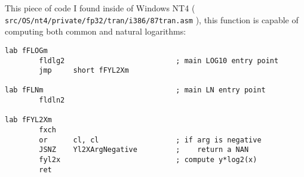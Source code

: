 This piece of code I found inside of Windows NT4 ( \texttt{src/OS/nt4/private/fp32/tran/i386/87tran.asm} ), 
this function is capable of computing both common and natural logarithms: 

\begin{lstlisting}[caption=Assembly language code]
lab fFLOGm
        fldlg2                          ; main LOG10 entry point
        jmp     short fFYL2Xm

lab fFLNm                               ; main LN entry point
        fldln2

lab fFYL2Xm
        fxch
        or      cl, cl                  ; if arg is negative
        JSNZ    Yl2XArgNegative         ;    return a NAN
        fyl2x                           ; compute y*log2(x)
        ret
\end{lstlisting}


